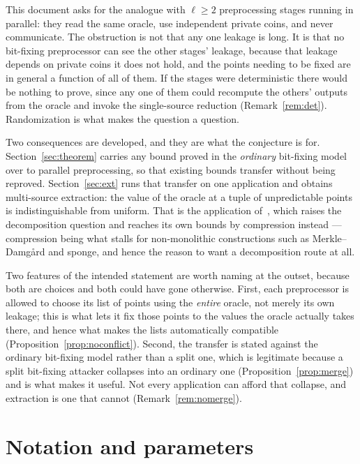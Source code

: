 \documentclass{conjura-conjecture}
\begin{document}
This document asks for the analogue with $\ell \ge 2$ preprocessing stages
running in parallel: they read the same oracle, use independent private
coins, and never communicate. The obstruction is not that any one leakage
is long. It is that no bit-fixing preprocessor can see the other stages'
leakage, because that leakage depends on private coins it does not hold,
and the points needing to be fixed are in general a function of all of
them. If the stages were deterministic there would be nothing to prove,
since any one of them could recompute the others' outputs from the oracle
and invoke the single-source reduction (Remark~\ref{rem:det}).
Randomization is what makes the question a question.

Two consequences are developed, and they are what the conjecture is for.
Section~\ref{sec:theorem} carries any bound proved in the \emph{ordinary}
bit-fixing model over to parallel preprocessing, so that existing bounds
transfer without being reproved. Section~\ref{sec:ext} runs that transfer
on one application and obtains multi-source extraction: the value of the
oracle at a tuple of unpredictable points is indistinguishable from
uniform. That is the application of~\cite[\S1.4]{CFHS}, which raises the
decomposition question and reaches its own bounds by compression instead
--- compression being what stalls for non-monolithic constructions such as
Merkle--Damg\aa{}rd and sponge, and hence the reason to want a
decomposition route at all.

Two features of the intended statement are worth naming at the outset,
because both are choices and both could have gone otherwise. First, each
preprocessor is allowed to choose its list of points using the
\emph{entire} oracle, not merely its own leakage; this is what lets it fix
those points to the values the oracle actually takes there, and hence what
makes the lists automatically compatible
(Proposition~\ref{prop:noconflict}). Second, the transfer is stated
against the ordinary bit-fixing model rather than a split one, which is
legitimate because a split bit-fixing attacker collapses into an ordinary
one (Proposition~\ref{prop:merge}) and is what makes it useful. Not every
application can afford that collapse, and extraction is one that cannot
(Remark~\ref{rem:nomerge}).

\section{Notation and parameters}\label{sec:notation}
\end{document}
